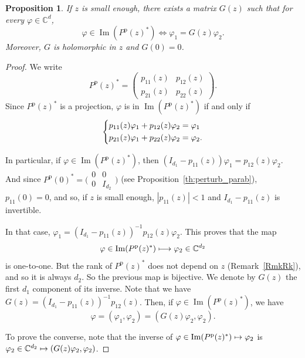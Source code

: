 \documentclass[10pt]{amsart}
\def\mto{\mathchoice{\longmapsto}{\mapsto}{\mapsto}{\mapsto}}
\theoremstyle{plain}
\newtheorem{prop}[theorem]{Proposition}
\theoremstyle{definition}
\theoremstyle{remark}
\DeclareMathOperator{\Ima}{Im}
\newcommand{\set}{\mathbb}
\renewcommand{\C}{\set{C}}
\newcommand{\p}{{\mathrm p}}
\let\originalleft\left
\let\originalright\right
\renewcommand{\left}{\mathopen{}\mathclose\bgroup\originalleft}
\renewcommand{\right}{\aftergroup\egroup\originalright}
\begin{document}
\begin{prop}
\label{Prop:DefG}
If $z$ is small enough, there exists a matrix $G(z)$ such that for every $\varphi\in\set C^d$,
\[
\varphi\in\Ima(P^\p(z)^\ast) \iff \varphi_1 = G(z)\varphi_2.
\]
Moreover, $G$ is holomorphic in $z$ and $G(0) = 0$.
\end{prop}
\begin{proof}
We write
\[
P^\p(z)^\ast = \begin{pmatrix} p_{11}(z)&p_{12}(z)\\p_{21}(z)&p_{22}(z)\end{pmatrix}.
\]
Since $P^\p(z)^\ast$ is a projection, $\varphi$ is in $\Ima (P^\p(z)^\ast)$ if and only if
\begin{equation*}
\left\{\begin{aligned}p_{11}(z)\varphi_1 + p_{12}(z)\varphi_2 &= \varphi_1\\
p_{21}(z)\varphi_1 + p_{22}(z)\varphi_2 &= \varphi_2. \end{aligned}\right.
\end{equation*}

In particular, if $\varphi\in\Ima(P^\p(z)^\ast)$, then $(I_{d_1}-p_{11}(z))\varphi_1 = p_{12}(z) \varphi_2$. And since $P^\p(0)^\ast = \big(\begin{smallmatrix}0&0\\0&I_{d_2}\end{smallmatrix} \big)$ (see Proposition~\ref{th:perturb_parab}), $p_{11}(0) = 0$, and so, if $z$ is small enough, $|p_{11}(z)|<1$ and $I_{d_1} - p_{11}(z)$ is invertible.

In that case, $\varphi_1 = (I_{d_1} - p_{11}(z))^{-1} p_{12}(z) \varphi_2$. This proves that the map
\[
\varphi \in \Ima(P^\p(z)^\ast) \mto \varphi_2 \in \C^{d_2}
\]
is one-to-one. But the rank of $P^\p(z)^\ast$ does not depend on $z$ (Remark~\ref{RmkRk}), and so it is always $d_2$. So the previous map is bijective. We denote by $G(z)$ the first $d_1$ component of its inverse. Note that we have $G(z) = (I_{d_1} - p_{11}(z))^{-1} p_{12}(z)$. Then, if $\varphi\in\Ima(P^\p(z)^\ast)$, we have
\[
\varphi = (\varphi_1,\varphi_2) = (G(z)\varphi_2,\varphi_2).
\]

To prove the converse, note that the inverse of $\varphi\in\Ima(P^\p(z)^\ast)\mto \varphi_2$ is $\varphi_2\in\C^{d_2}\mto (G(z)\varphi_2,\varphi_2)$.
\end{proof}
\end{document}
